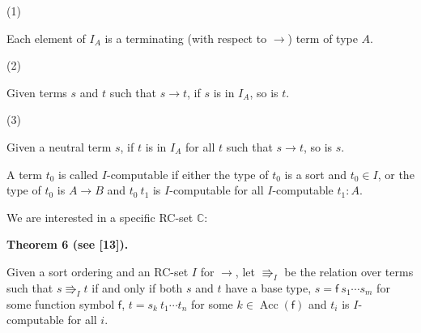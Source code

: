 \par\noindent  (1) 
 
Each element of $I_{A}$ is a terminating (with respect to $\rightarrow$) term of type $A$.\par
 
 
 
\par\noindent  (2) 
 
Given terms $s$ and $t$ such that $s\rightarrow t$, if $s$ is in $I_{A}$, so is $t$.\par
 
 
 
\par\noindent  (3) 
 
Given a neutral term $s$, if $t$ is in $I_{A}$ for all $t$ such that $s\rightarrow t$, so is $s$.\par
 
 
  
A term $t_{0}$ is called $I$-computable if either the type of $t_{0}$ is a sort and $t_{0}\in I$, or the type of $t_{0}$ is $A\rightarrow B$ and ${t_{0}}\ {t_{1}}$ is $I$-computable for all $I$-computable $t_{1}:A$.\par
 
 
 
We are interested in a specific RC-set $\mathbb{C}$:\par
 
 
 
\par\medskip\noindent\textbf{Theorem 6 (see [13]).}\par
 
 
Given a sort ordering and an RC-set $I$ for $\rightarrow$, let $\Rrightarrow_{I}$ be the relation over terms such that $s\Rrightarrow_{I}t$ if and only if both $s$ and $t$ have a base type, $s={\mathsf{f}}\ {{s}_{1}\cdots{s}_{m}}$ for some function symbol $\mathsf{f}$, $t={s_{k}}\ {{t}_{1}\cdots{t}_{n}}$ for some $k\in\operatorname{Acc}(\mathsf{f})$ and $t_{i}$ is $I$-computable for all $i$.\par
 
 
 
